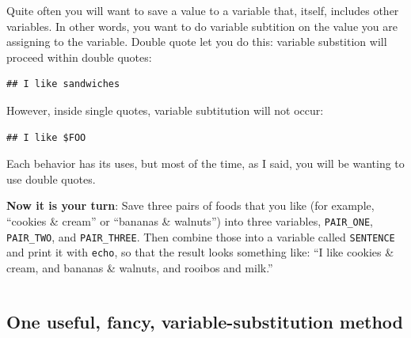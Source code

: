 \documentclass[]{krantz}
\makeatletter
\newenvironment{Shaded}{\begin{snugshade}}{\end{snugshade}}
\newcommand{\BuiltInTok}[1]{#1}
\newcommand{\NormalTok}[1]{#1}
\newcommand{\StringTok}[1]{\textcolor[rgb]{0.5,0.5,0.5}{#1}}
\newcommand{\VariableTok}[1]{\textcolor[rgb]{0,0,0}{#1}}
\newenvironment{kframe}{%
\medskip{}
\setlength{\fboxsep}{.8em}
 \def\at@end@of@kframe{}%
 \ifinner\ifhmode%
  \def\at@end@of@kframe{\end{minipage}}%
  \begin{minipage}{\columnwidth}%
 \fi\fi%
 \def\FrameCommand##1{\hskip\@totalleftmargin \hskip-\fboxsep
 \colorbox{shadecolor}{##1}\hskip-\fboxsep
     \hskip-\linewidth \hskip-\@totalleftmargin \hskip\columnwidth}%
 \MakeFramed {\advance\hsize-\width
   \@totalleftmargin\z@ \linewidth\hsize
   \@setminipage}}%
 {\par\unskip\endMakeFramed%
 \at@end@of@kframe}
\renewenvironment{Shaded}{\begin{kframe}}{\end{kframe}}
\makeatother
\begin{document}
Quite often you will want to save a value to a variable that, itself,
includes other variables. In other words, you want to do variable
subtition on the value you are assigning to the variable. Double quote
let you do this: variable substition will proceed within double quotes:

\begin{Shaded}
\end{Shaded}

\begin{verbatim}
## I like sandwiches
\end{verbatim}

However, inside single quotes, variable subtitution will not occur:

\begin{Shaded}
\end{Shaded}

\begin{verbatim}
## I like $FOO
\end{verbatim}

Each behavior has its uses, but most of the time, as I said, you will be wanting to use
double quotes.

\textbf{Now it is your turn}: Save three pairs of foods that you like (for example,
``cookies \& cream'' or ``bananas \& walnuts'') into
three variables, \texttt{PAIR\_ONE}, \texttt{PAIR\_TWO}, and \texttt{PAIR\_THREE}. Then combine those into
a variable called \texttt{SENTENCE} and print it with \texttt{echo}, so that the result looks something
like: ``I like cookies \& cream, and bananas \& walnuts, and rooibos and milk.''

\begin{verbatim}
\end{verbatim}

\hypertarget{one-useful-fancy-variable-substitution-method}{%
\subsection{One useful, fancy, variable-substitution method}\label{one-useful-fancy-variable-substitution-method}}
\end{document}
